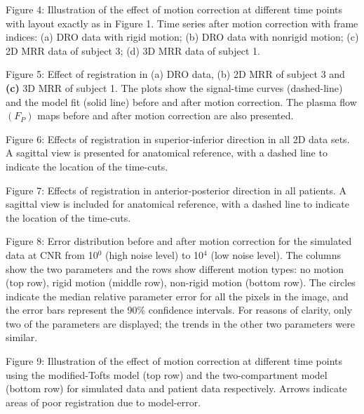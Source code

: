\documentclass[num-refs]{wiley-article}
\begin{document}
\noindent Figure 4:  Illustration of the effect of motion correction at different time points with layout exactly as in Figure 1. Time series after motion correction with frame indices: (a) DRO data with rigid motion; (b) DRO data with nonrigid motion; (c) 2D MRR data of subject 3; (d) 3D MRR data of subject 1. 

\noindent Figure 5: Effect of registration in  (a) DRO data,  (b) 2D MRR of subject 3 and {\bf (c)} 3D MRR of subject 1. The plots show the signal-time curves (dashed-line) and the model fit (solid line) before and after motion correction. The plasma flow $(F_P)$ maps before and after motion correction are also presented.

\noindent Figure 6: Effects of registration in superior-inferior direction in all 2D data sets. A sagittal view is presented for anatomical reference, with a dashed line to indicate the location of the time-cuts.

\noindent Figure 7: Effects of registration in anterior-posterior direction in all patients. A sagittal view is included for anatomical reference, with a dashed line to indicate the location of the time-cuts.

\noindent Figure 8: Error distribution before and after motion correction for the simulated data at CNR from 10$^0$ (high noise level) to 10$^4$ (low noise level). The columns show the two parameters and the rows show different motion types: no motion (top row), rigid motion (middle row), non-rigid motion (bottom row). The circles indicate the median relative parameter error for all the pixels in the image, and the error bars represent the 90\%  confidence intervals. For reasons of clarity, only two of the parameters are displayed; the trends in the other two parameters were similar.

\noindent Figure 9: Illustration of the effect of motion correction at different time points using the modified-Tofts model (top row) and the two-compartment model (bottom row) for simulated data and patient data respectively. Arrows indicate areas of poor registration due to model-error.
\end{document}
